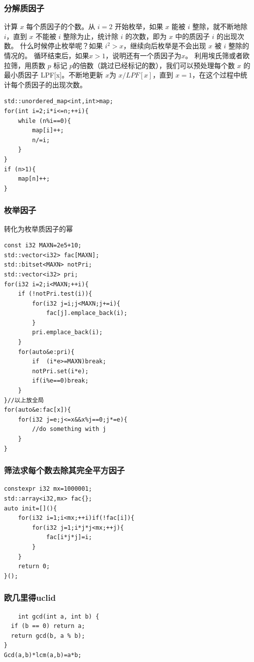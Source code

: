 \documentclass[UTF8,twoside]{ctexart}
\begin{document}
\subsubsection{分解质因子}
计算 $x$ 每个质因子的个数。从 $i=2$ 开始枚举，如果 $x$ 能被 $i$ 整除，就不断地除 $i$，直到 $x$ 不能被 $i$ 整除为止，统计除 $i$ 的次数，即为 $x$ 中的质因子 $i$ 的出现次数。
什么时候停止枚举呢？如果 $i ^2>x$，继续向后枚举是不会出现 $x$ 被 $i$ 整除的情况的。
循环结束后，如果$ x>1$，说明还有一个质因子为$ x$。
利用埃氏筛或者欧拉筛，用质数 $p$ 标记 $p$的倍数（跳过已经标记的数），我们可以预处理每个数 $x$ 的最小质因子 LPF[x]。不断地更新 $x $为  $x/LPF[x] $，直到 $x=1$，在这个过程中统计每个质因子的出现次数。
\begin{lstlisting}
std::unordered_map<int,int>map;
for(int i=2;i*i<=n;++i){
    while (n%i==0){
        map[i]++;
        n/=i;
    }
}
if (n>1){
    map[n]++;
}
\end{lstlisting}
\subsubsection{枚举因子}
转化为枚举质因子的幂
\begin{lstlisting}
const i32 MAXN=2e5+10;
std::vector<i32> fac[MAXN];
std::bitset<MAXN> notPri;
std::vector<i32> pri;
for(i32 i=2;i<MAXN;++i){
    if (!notPri.test(i)){
        for(i32 j=i;j<MAXN;j+=i){
            fac[j].emplace_back(i);
        }
        pri.emplace_back(i);
    }
    for(auto&e:pri){
        if  (i*e>=MAXN)break;
        notPri.set(i*e);
        if(i%e==0)break;
    }
}//以上放全局
for(auto&e:fac[x]){
    for(i32 j=e;j<=x&&x%j==0;j*=e){
        //do something with j
    }
}
\end{lstlisting}
\subsubsection{筛法求每个数去除其完全平方因子}
\begin{lstlisting}
constexpr i32 mx=1000001;
std::array<i32,mx> fac{};
auto init=[](){
    for(i32 i=1;i<mx;++i)if(!fac[i]){
        for(i32 j=1;i*j*j<mx;++j){
            fac[i*j*j]=i;
        }
    }
    return 0;
}();
\end{lstlisting}
\subsubsection{欧几里得uclid}
\begin{lstlisting}
    int gcd(int a, int b) {
  if (b == 0) return a;
  return gcd(b, a % b);
}
Gcd(a,b)*lcm(a,b)=a*b;
\end{lstlisting}
\end{document}
